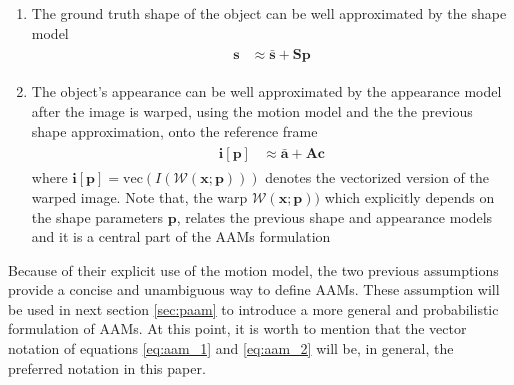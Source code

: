 \begin{enumerate}
	\item The ground truth shape of the object can be well approximated by the shape model
	\begin{eqnarray}
		\begin{aligned}
			\mathbf{s} & \approx \mathbf{\bar{s}} + \mathbf{S} \mathbf{p}
		\end{aligned}
	    \label{eq:aam_1}
	\end{eqnarray}

	\item The object's appearance can be well approximated by the appearance model after the image is warped, using the motion model and the the previous shape approximation, onto the reference frame
	\begin{eqnarray}
		\begin{aligned}
			\mathbf{i}[\mathbf{p}] & \approx \mathbf{\bar{a}} + \mathbf{A} \mathbf{c} 
		\end{aligned}
	    \label{eq:aam_2}
	\end{eqnarray}
	where $\mathbf{i}[\mathbf{p}] = \mathrm{vec}(I(\mathcal{W}(\mathbf{x}; \mathbf{p})))$ denotes the vectorized version of the warped image. Note that, the warp $\mathcal{W}(\mathbf{x}; \mathbf{p}))$ which explicitly depends on the shape parameters $\mathbf{p}$, relates the previous shape and appearance models and it is a central part of the AAMs formulation
\end{enumerate}

Because of their explicit use of the motion model, the two previous assumptions provide a concise and unambiguous way to define AAMs. These assumption will be used in next section \ref{sec:paam} to introduce a more general and probabilistic formulation of AAMs. At this point, it is worth to mention that the vector notation of equations \ref{eq:aam_1} and \ref{eq:aam_2} will be, in general, the preferred notation in this paper.


